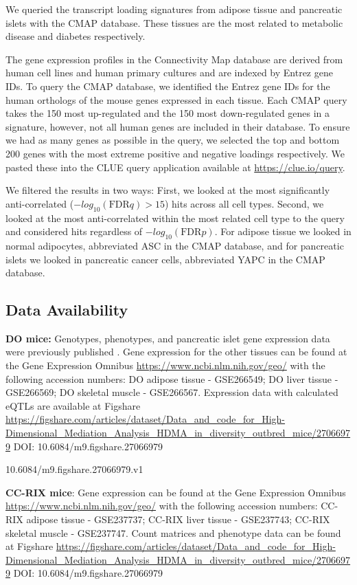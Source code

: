 \documentclass[
]{article}
\begin{document}
We queried the transcript loading signatures from adipose tissue and
pancreatic islets with the CMAP database. These tissues are the most
related to metabolic disease and diabetes respectively.

The gene expression profiles in the Connectivity Map database are
derived from human cell lines and human primary cultures and are indexed
by Entrez gene IDs. To query the CMAP database, we identified the Entrez
gene IDs for the human orthologs of the mouse genes expressed in each
tissue. Each CMAP query takes the 150 most up-regulated and the 150 most
down-regulated genes in a signature, however, not all human genes are
included in their database. To ensure we had as many genes as possible
in the query, we selected the top and bottom 200 genes with the most
extreme positive and negative loadings respectively. We pasted these
into the CLUE query application available at
\url{https://clue.io/query}.

We filtered the results in two ways: First, we looked at the most
significantly anti-correlated (\(-log_{10}(\mathrm{FDR} q) > 15\)) hits
across all cell types. Second, we looked at the most anti-correlated
within the most related cell type to the query and considered hits
regardless of \(-log_{10}(\mathrm{FDR} p)\). For adipose tissue we
looked in normal adipocytes, abbreviated ASC in the CMAP database, and
for pancreatic islets we looked in pancreatic cancer cells, abbreviated
YAPC in the CMAP database.

\subsection{Data Availability}\label{data-availability}

\textbf{DO mice:} Genotypes, phenotypes, and pancreatic islet gene
expression data were previously published \cite{pmid29567659}. Gene
expression for the other tissues can be found at the Gene Expression
Omnibus \url{https://www.ncbi.nlm.nih.gov/geo/} with the following
accession numbers: DO adipose tissue - GSE266549; DO liver tissue -
GSE266569; DO skeletal muscle - GSE266567. Expression data with
calculated eQTLs are available at Figshare
\url{https://figshare.com/articles/dataset/Data_and_code_for_High-Dimensional_Mediation_Analysis_HDMA_in_diversity_outbred_mice/27066979}
DOI: 10.6084/m9.figshare.27066979

10.6084/m9.figshare.27066979.v1

\textbf{CC-RIX mice}: Gene expression can be found at the Gene
Expression Omnibus \url{https://www.ncbi.nlm.nih.gov/geo/} with the
following accession numbers: CC-RIX adipose tissue - GSE237737; CC-RIX
liver tissue - GSE237743; CC-RIX skeletal muscle - GSE237747. Count
matrices and phenotype data can be found at Figshare
\url{https://figshare.com/articles/dataset/Data_and_code_for_High-Dimensional_Mediation_Analysis_HDMA_in_diversity_outbred_mice/27066979}
DOI: 10.6084/m9.figshare.27066979
\end{document}
